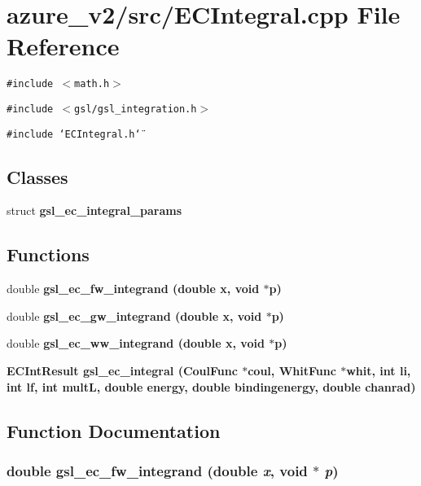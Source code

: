 \section{azure\_\-v2/src/ECIntegral.cpp File Reference}
\label{ECIntegral_8cpp}
{\tt \#include $<$math.h$>$}\par
{\tt \#include $<$gsl/gsl\_\-integration.h$>$}\par
{\tt \#include \char`\"{}ECIntegral.h\char`\"{}}\par
\subsection*{Classes}
\begin{CompactItemize}
\item 
struct \bf{gsl\_\-ec\_\-integral\_\-params}
\end{CompactItemize}
\subsection*{Functions}
\begin{CompactItemize}
\item 
double \bf{gsl\_\-ec\_\-fw\_\-integrand} (double x, void $\ast$p)
\item 
double \bf{gsl\_\-ec\_\-gw\_\-integrand} (double x, void $\ast$p)
\item 
double \bf{gsl\_\-ec\_\-ww\_\-integrand} (double x, void $\ast$p)
\item 
\bf{ECInt\-Result} \bf{gsl\_\-ec\_\-integral} (\bf{Coul\-Func} $\ast$coul, \bf{Whit\-Func} $\ast$whit, int li, int lf, int mult\-L, double energy, double bindingenergy, double chanrad)
\end{CompactItemize}


\subsection{Function Documentation}
\subsubsection{\setlength{\rightskip}{0pt plus 5cm}double gsl\_\-ec\_\-fw\_\-integrand (double {\em x}, void $\ast$ {\em p})}\label{ECIntegral_8cpp_8c8a66f3132a7406ab4c0823aaf9da43}


